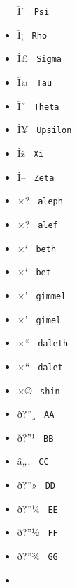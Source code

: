 \begin{itemize}
  \label{symbol-Psi}{{ Î¨ } \texttt{\ Psi\ }}
\item
  \label{symbol-Rho}{{ Î¡ } \texttt{\ Rho\ }}
\item
  \label{symbol-Sigma}{{ Î£ } \texttt{\ Sigma\ }}
\item
  \label{symbol-Tau}{{ Î¤ } \texttt{\ Tau\ }}
\item
  \label{symbol-Theta}{{ Î˜ } \texttt{\ Theta\ }}
\item
  \label{symbol-Upsilon}{{ Î¥ } \texttt{\ Upsilon\ }}
\item
  \label{symbol-Xi}{{ Îž } \texttt{\ Xi\ }}
\item
  \label{symbol-Zeta}{{ Î-- } \texttt{\ Zeta\ }}
\item
  \label{symbol-aleph}{{ ×? } \texttt{\ aleph\ }}
\item
  \label{symbol-alef}{{ ×? } \texttt{\ alef\ }}
\item
  \label{symbol-beth}{{ ×` } \texttt{\ beth\ }}
\item
  \label{symbol-bet}{{ ×` } \texttt{\ bet\ }}
\item
  \label{symbol-gimmel}{{ ×' } \texttt{\ gimmel\ }}
\item
  \label{symbol-gimel}{{ ×' } \texttt{\ gimel\ }}
\item
  \label{symbol-daleth}{{ ×`` } \texttt{\ daleth\ }}
\item
  \label{symbol-dalet}{{ ×`` } \texttt{\ dalet\ }}
\item
  \label{symbol-shin}{{ ×© } \texttt{\ shin\ }}
\item
  \label{symbol-AA}{{ ð?''¸ } \texttt{\ AA\ }}
\item
  \label{symbol-BB}{{ ð?''¹ } \texttt{\ BB\ }}
\item
  \label{symbol-CC}{{ â„‚ } \texttt{\ CC\ }}
\item
  \label{symbol-DD}{{ ð?''» } \texttt{\ DD\ }}
\item
  \label{symbol-EE}{{ ð?''¼ } \texttt{\ EE\ }}
\item
  \label{symbol-FF}{{ ð?''½ } \texttt{\ FF\ }}
\item
  \label{symbol-GG}{{ ð?''¾ } \texttt{\ GG\ }}
\item

\end{itemize}

